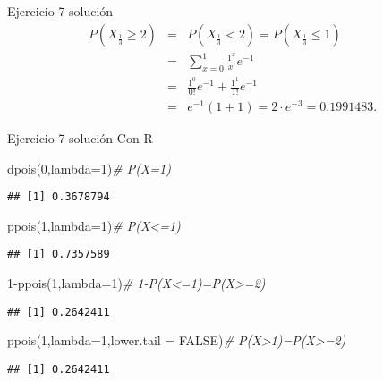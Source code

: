 \documentclass[
  ignorenonframetext,
]{beamer}
\newenvironment{Shaded}{\begin{snugshade}}{\end{snugshade}}
\newcommand{\AttributeTok}[1]{\textcolor[rgb]{0.77,0.63,0.00}{#1}}
\newcommand{\CommentTok}[1]{\textcolor[rgb]{0.56,0.35,0.01}{\textit{#1}}}
\newcommand{\ConstantTok}[1]{\textcolor[rgb]{0.00,0.00,0.00}{#1}}
\newcommand{\DecValTok}[1]{\textcolor[rgb]{0.00,0.00,0.81}{#1}}
\newcommand{\FunctionTok}[1]{\textcolor[rgb]{0.00,0.00,0.00}{#1}}
\newcommand{\NormalTok}[1]{#1}
\newcommand{\SpecialCharTok}[1]{\textcolor[rgb]{0.00,0.00,0.00}{#1}}
\begin{document}
\begin{frame}{Ejercicio 7 solución}
\protect\hypertarget{ejercicio-7-soluciuxf3n-1}{}
\[
\begin{array}{lll}
P\left(X_{\frac13}\geq 2 \right)&=&P\left(X_{\frac13}< 2 \right)=P\left(X_{\frac13}\leq 1\right)\\
&=&
\sum_{x=0}^1 \frac{1^x}{x!} e^{-1}
\\
&=&
\frac{1^0}{0!} e^{-1}+\frac{1^1}{1!} e^{-1}\\
&=&
e^{-1}\left(1+1\right)=2\cdot e^{-3}=0.1991483.
\end{array}
\]
\end{frame}

\begin{frame}[fragile]{Ejercicio 7 solución}
\protect\hypertarget{ejercicio-7-soluciuxf3n-2}{}
Con R

\begin{Shaded}
\begin{Highlighting}[]
\FunctionTok{dpois}\NormalTok{(}\DecValTok{0}\NormalTok{,}\AttributeTok{lambda=}\DecValTok{1}\NormalTok{)}\CommentTok{\# P(X=1)}
\end{Highlighting}
\end{Shaded}

\begin{verbatim}
## [1] 0.3678794
\end{verbatim}

\begin{Shaded}
\begin{Highlighting}[]
\FunctionTok{ppois}\NormalTok{(}\DecValTok{1}\NormalTok{,}\AttributeTok{lambda=}\DecValTok{1}\NormalTok{)}\CommentTok{\# P(X\textless{}=1)}
\end{Highlighting}
\end{Shaded}

\begin{verbatim}
## [1] 0.7357589
\end{verbatim}

\begin{Shaded}
\begin{Highlighting}[]
\DecValTok{1}\SpecialCharTok{{-}}\FunctionTok{ppois}\NormalTok{(}\DecValTok{1}\NormalTok{,}\AttributeTok{lambda=}\DecValTok{1}\NormalTok{)}\CommentTok{\# 1{-}P(X\textless{}=1)=P(X\textgreater{}=2)}
\end{Highlighting}
\end{Shaded}

\begin{verbatim}
## [1] 0.2642411
\end{verbatim}

\begin{Shaded}
\begin{Highlighting}[]
\FunctionTok{ppois}\NormalTok{(}\DecValTok{1}\NormalTok{,}\AttributeTok{lambda=}\DecValTok{1}\NormalTok{,}\AttributeTok{lower.tail =} \ConstantTok{FALSE}\NormalTok{)}\CommentTok{\# P(X\textgreater{}1)=P(X\textgreater{}=2)}
\end{Highlighting}
\end{Shaded}

\begin{verbatim}
## [1] 0.2642411
\end{verbatim}
\end{frame}
\end{document}
